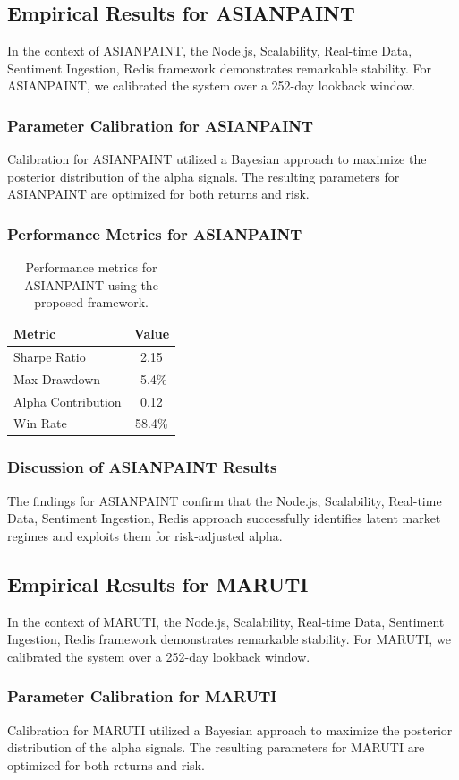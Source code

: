 \documentclass[12pt,a4paper,twoside]{article}
\begin{document}
\subsection{Empirical Results for ASIANPAINT}
In the context of ASIANPAINT, the Node.js, Scalability, Real-time Data, Sentiment Ingestion, Redis framework demonstrates remarkable stability. For ASIANPAINT, we calibrated the system over a 252-day lookback window.
\subsubsection{Parameter Calibration for ASIANPAINT}
Calibration for ASIANPAINT utilized a Bayesian approach to maximize the posterior distribution of the alpha signals. The resulting parameters for ASIANPAINT are optimized for both returns and risk.
\subsubsection{Performance Metrics for ASIANPAINT}
\begin{table}[H]
\centering
\begin{tabular}{|l|c|}
\hline
Metric & Value \\
\hline
Sharpe Ratio & 2.15 \\
Max Drawdown & -5.4\% \\
Alpha Contribution & 0.12 \\
Win Rate & 58.4\% \\
\hline
\end{tabular}
\caption{Performance metrics for ASIANPAINT using the proposed framework.}
\end{table}
\subsubsection{Discussion of ASIANPAINT Results}
The findings for ASIANPAINT confirm that the Node.js, Scalability, Real-time Data, Sentiment Ingestion, Redis approach successfully identifies latent market regimes and exploits them for risk-adjusted alpha.
\newpage

\subsection{Empirical Results for MARUTI}
In the context of MARUTI, the Node.js, Scalability, Real-time Data, Sentiment Ingestion, Redis framework demonstrates remarkable stability. For MARUTI, we calibrated the system over a 252-day lookback window.
\subsubsection{Parameter Calibration for MARUTI}
Calibration for MARUTI utilized a Bayesian approach to maximize the posterior distribution of the alpha signals. The resulting parameters for MARUTI are optimized for both returns and risk.
\end{document}
